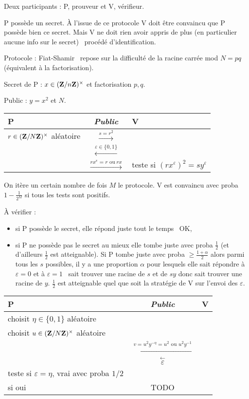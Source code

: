 Deux participants : P, prouveur et V, vérifieur.

P possède un secret.
À l'issue de ce protocole V doit être convaincu que P possède bien ce secret.
Mais V ne doit rien avoir appris de plus (en particulier aucune info sur le secret) \textrightarrow\ procédé d'identification.

Protocole : Fiat-Shamir \textrightarrow\ repose sur la difficulté de la racine carrée mod $N = pq$ (équivalent à la factorisation).

Secret de P : $x \in (\mathbf{Z} / n\mathbf{Z})^\times$ et factorisation $p,q$.

Public : $y = x^2$ et $N$.

\begin{table}[h]\centering
\begin{tabular}{aca}
	P & \textit{Public} & V \\
	\hline
	$r \in (\mathbf{Z} / N\mathbf{Z})^\times$ aléatoire & $\overset{s = r^2}{\longrightarrow}$ & \\
	 & $\overset{\varepsilon \in \{ 0, 1 \} }{\longleftarrow}$ & \\
	 & $\overset{r x^\varepsilon = r \text{ ou}\ rx}{\longrightarrow}$ & teste si $(r x^\varepsilon)^2 = s y^\varepsilon$
\end{tabular}
\end{table}

On itère un certain nombre de fois $M$ le protocole.
V est convaincu avec proba $1 - \frac{1}{2^M}$ si tous les tests sont positifs.

À vérifier :
\begin{itemize}
	\item[\textbullet] si P possède le secret, elle répond juste tout le temps \textrightarrow\ OK,
	\item[\textbullet] si P ne possède pas le secret au mieux elle tombe juste avec proba $\frac{1}{2}$ (et d'ailleurs $\frac{1}{2}$ est atteignable).
		Si P tombe juste avec proba $\geq \frac{1 + \alpha}{2}$ alors parmi tous les $s$ possibles, il y a une proportion $\alpha$ pour lesquels elle sait répondre à $\varepsilon = 0$ et à $\varepsilon = 1$ \textrightarrow\ sait trouver une racine de $s$ et de $sy$ donc sait trouver une racine de $y$.
		$\frac{1}{2}$ est atteignable quel que soit la stratégie de V sur l'envoi des $\varepsilon$.
\end{itemize}

\begin{table}[h]\centering
\begin{tabular}{aca}
	P & \textit{Public} & V \\
	\hline
	choisit $\eta \in \{ 0, 1 \}$ aléatoire &  & \\
	choisit $u \in (\mathbf{Z} / N\mathbf{Z})^\times$ aléatoire &  & \\
	 & $\overset{v = u^2 y^{-\eta} = u^2 \text{ ou } u^2 y^{-1} }{\longleftarrow}$ & \\
	 & $\overset{\longleftarrow}{\varepsilon}$ & \\
	{teste si $\varepsilon = \eta$, vrai avec proba $1/2$} & & \\
	si oui & TODO & 
\end{tabular}
\end{table}

